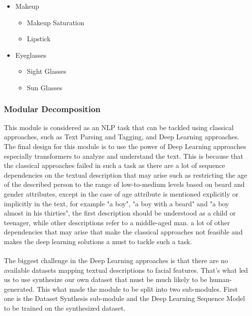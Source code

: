 \begin{itemize}
    \item Makeup
    \begin{itemize}
    	 \item Makeup Saturation            \hspace*{\fill Continuous}
    	 \item Lipstick                     \hspace*{\fill Binary}
    \end{itemize}


    \item Eyeglasses
    \begin{itemize}
    	 \item Sight Glasses                \hspace*{\fill Binary}
    	 \item Sun Glasses                  \hspace*{\fill Binary}
    \end{itemize}

\end{itemize}



\subsubsection{Modular Decomposition}
This module is considered as an NLP task that can be tackled using classical approaches, such as Text Parsing and Tagging, and Deep Learning approaches. The final design for this module is to use the power of Deep Learning approaches especially transformers to analyze and understand the text. This is because that the classical approaches failed in such a task as there are a lot of sequence dependencies on the textual description that may arise such as restricting the age of the described person to the range of low-to-medium levels based on beard and gender attributes, except in the case of age attribute is mentioned explicitly or implicitly in the text, for example "a boy", "a boy with a beard" and "a boy almost in his thirties", the first description should be understood as a child or teenager, while other descriptions refer to a middle-aged man. a lot of other dependencies that may arise that make the classical approaches not feasible and makes the deep learning solutions a must to tackle such a task. 
\\
\\
The biggest challenge in the Deep Learning approaches is that there are no available datasets mapping textual descriptions to facial features. That’s what led us to use synthesize our own dataset that must be much likely to be human-generated. This what made the module to be split into two sub-modules. First one is the Dataset Synthesis sub-module and the Deep Learning Sequence Model to be trained on the synthesized dataset.

